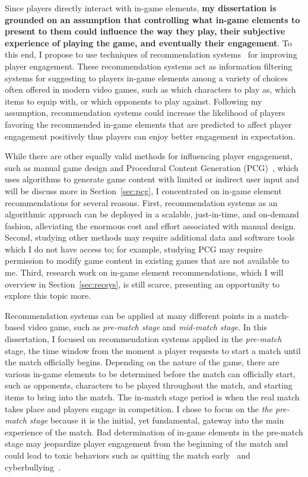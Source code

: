 Since players directly interact with in-game elements, \textbf{my dissertation is grounded on an assumption that controlling what in-game elements to present to them could influence the way they play, their subjective experience of playing the game, and eventually their engagement}. To this end, I propose to use techniques of recommendation systems~\citep{medler2011using} for improving player engagement. These recommendation systems act as information filtering systems for suggesting to players in-game elements among a variety of choices  often offered in modern video games, such as which characters to play as, which items to equip with, or which opponents to play against. Following my assumption, recommendation systems could increase the likelihood of players favoring the recommended in-game elements that are predicted to affect player engagement positively thus players can enjoy better engagement in expectation. 

While there are other equally valid methods for influencing player engagement, such as manual game design and Procedural Content Generation (PCG)~\citep{yannakakis2011experience,togelius2011search}, which uses algorithms to generate game content with limited or indirect user input and will be discuss more in Section~\ref{sec:pcg}, I concentrated on in-game element recommendations for several reasons. First, recommendation systems as an algorithmic approach can be deployed in a scalable, just-in-time, and on-demand fashion, alleviating the enormous cost and effort associated with manual design. Second, studying other methods may require additional data and software tools which I do not have access to; for example, studying PCG may require permission to modify game content in existing games that are not available to me. Third, research work on in-game element recommendations, which I will overview in Section~\ref{sec:recsys}, is still scarce, presenting an opportunity to explore this topic more. 

Recommendation systems can be applied at many different points in a match-based video game, such as \textit{pre-match stage} and \textit{mid-match stage}. In this dissertation, I focused on recommendation systems applied in the \textit{pre-match} stage, the time window from the moment a player requests to start a match until the match officially begins. Depending on the nature of the game, there are various in-game elements to be determined before the match can officially start, such as opponents, characters to be played throughout the match, and starting items to bring into the match. The in-match stage period is when the real match takes place and players engage in competition. I chose to focus on the \textit{the pre-match stage} because it is the initial, yet fundamental, gateway into the main experience of the match. Bad determination of in-game elements in the pre-match stage may jeopardize player engagement from the beginning of the match and could lead to toxic behaviors such as quitting the match early~\citep{shores2014identification} and cyberbullying~\citep{kwak2015exploring}. 

